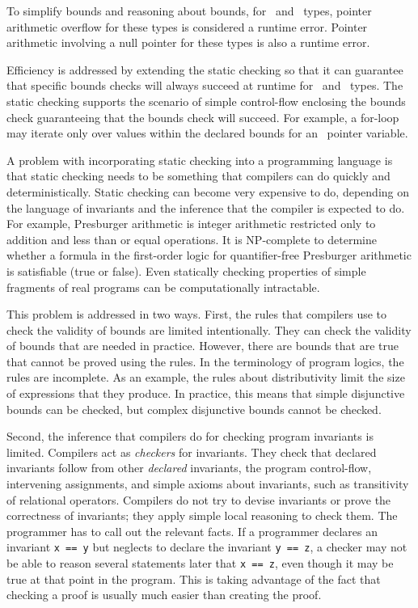 To simplify bounds and reasoning about bounds, for \arrayview\
and \arrayptr\ types, pointer arithmetic overflow for these
types is considered a runtime error. Pointer arithmetic involving a null
pointer for these types is also a runtime error.

Efficiency is addressed by extending the static checking so that it can
guarantee that specific bounds checks will always succeed at runtime for
\arrayptr\ and \arrayview\ types. The static checking
supports the scenario of simple control-flow enclosing the bounds check
guaranteeing that the bounds check will succeed. For example, a for-loop
may iterate only over values within the declared bounds for an
\arrayptr\ pointer variable.

A problem with incorporating static checking into a programming language
is that static checking needs to be something that compilers can do
quickly and deterministically. Static checking can become very expensive
to do, depending on the language of invariants and the inference that
the compiler is expected to do. For example, Presburger arithmetic is
integer arithmetic restricted only to addition and less than or equal
operations. It is NP-complete to determine whether a formula in the
first-order logic for quantifier-free Presburger arithmetic is
satisfiable (true or false). Even statically checking properties of
simple fragments of real programs can be computationally intractable.

This problem is addressed in two ways. First, the rules that compilers
use to check the validity of bounds are limited intentionally.  They can
check the validity of bounds that are needed in practice.  However, there are
bounds that are true that cannot be proved using the rules.  In the terminology
of program logics, the rules are incomplete.  As an example, the 
rules about distributivity limit the size of
expressions that they produce.   In practice, this means that 
simple disjunctive bounds can be checked, but complex disjunctive bounds cannot be checked.
 
Second, the inference that compilers do for checking program invariants is
limited.  Compilers act as \emph{checkers} for invariants. They check that
declared invariants follow from other \emph{declared} invariants, the
program control-flow, intervening assignments, and simple axioms about
invariants, such as transitivity of relational operators. Compilers
do not try to devise invariants or prove the correctness of
invariants; they apply simple local reasoning to check them. The
programmer has to call out the relevant facts. If a programmer declares
an invariant \texttt{x == y} but neglects to declare the invariant
\texttt{y == z}, a checker may not be able to reason several
statements later that \texttt{x == z}, even though it may be true at
that point in the program. This is taking advantage of the fact that
checking a proof is usually much easier than creating the proof.

